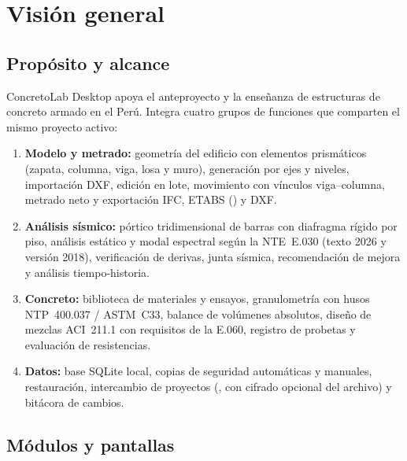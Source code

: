 \section{Visión general}

\subsection{Propósito y alcance}

ConcretoLab Desktop apoya el anteproyecto y la enseñanza de estructuras de concreto armado en el Perú. Integra cuatro
grupos de funciones que comparten el mismo proyecto activo:

\begin{enumerate}
	\item \textbf{Modelo y metrado:} geometría del edificio con elementos prismáticos (zapata, columna, viga, losa y muro),
	      generación por ejes y niveles, importación DXF, edición en lote, movimiento con vínculos viga--columna, metrado
	      neto y exportación IFC, ETABS () y DXF.
	\item \textbf{Análisis sísmico:} pórtico tridimensional de barras con diafragma rígido por piso, análisis estático y
	      modal espectral según la NTE~E.030 (texto 2026 y versión 2018), verificación de derivas, junta sísmica,
	      recomendación de mejora y análisis tiempo-historia.
	\item \textbf{Concreto:} biblioteca de materiales y ensayos, granulometría con husos NTP~400.037 / ASTM~C33, balance de
	      volúmenes absolutos, diseño de mezclas ACI~211.1 con requisitos de la E.060, registro de probetas y evaluación
	      de resistencias.
	\item \textbf{Datos:} base SQLite local, copias de seguridad automáticas y manuales, restauración, intercambio de
	      proyectos (, con cifrado opcional del archivo) y bitácora de cambios.
\end{enumerate}

\subsection{Módulos y pantallas}


